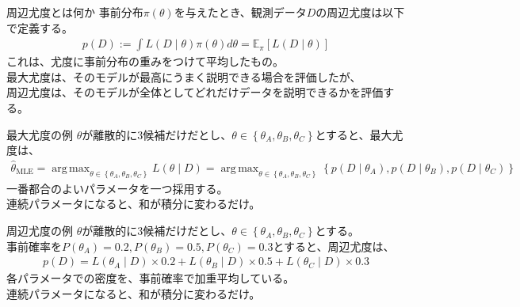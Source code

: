 \documentclass[dvipdfmx, 11pt, aspectratio=169, notheorems]{beamer}
\newcommand{\E}{\mathbb{E}}
\DeclareMathOperator*{\argmax}{arg\,max}
\begin{document}
\begin{frame}{周辺尤度とは何か}
    事前分布$\pi(\theta)$を与えたとき、観測データ$D$の周辺尤度は以下で定義する。
    \begin{align}
        p(D) := \int L(D\mid\theta)\pi(\theta)d\theta = \E_\pi[L(D\mid\theta)]
    \end{align}
    これは、\alert{尤度に事前分布の重みをつけて平均したもの}。\\
    \vspace{12pt}
    最大尤度は、そのモデルが最高にうまく説明できる場合を評価したが、\\
    周辺尤度は、そのモデルが全体としてどれだけデータを説明できるかを評価する。
\end{frame}

\begin{frame}{最大尤度の例}
    $\theta$が離散的に3候補だけだとし、$\theta \in \left\{\theta_A, \theta_B, \theta_C\right\}$とすると、最大尤度は、
    \begin{align}
        \hat{\theta}_{\text{MLE}} = \argmax_{\theta \in \left\{\theta_A, \theta_B, \theta_C\right\}} L(\theta\mid D) = \argmax_{\theta \in \left\{\theta_A, \theta_B, \theta_C\right\}}\left\{p(D\mid\theta_A), p(D\mid\theta_B), p(D\mid\theta_C)\right\}
    \end{align}
    \vspace{12pt}
    \alert{一番都合のよいパラメータを一つ採用する}。\\
    連続パラメータになると、和が積分に変わるだけ。
\end{frame}

\begin{frame}{周辺尤度の例}
    $\theta$が離散的に3候補だけだとし、$\theta \in \left\{\theta_A, \theta_B, \theta_C\right\}$とする。\\
    事前確率を$P(\theta_A) = 0.2, P(\theta_B) = 0.5, P(\theta_C) = 0.3$とすると、周辺尤度は、
    \begin{align}
        p(D) = L(\theta_A\mid D)\times 0.2 + L(\theta_B\mid D) \times 0.5 + L(\theta_C\mid D) \times 0.3
    \end{align}
    \vspace{12pt}
    \alert{各パラメータでの密度を、事前確率で加重平均している}。\\
    連続パラメータになると、和が積分に変わるだけ。
\end{frame}
\end{document}
